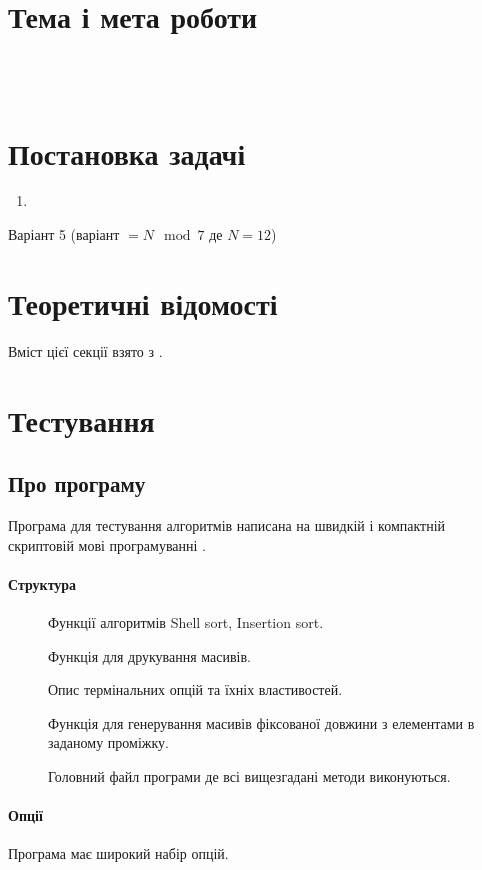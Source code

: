 \nocite{*}
\sffamily

\section{Тема і мета роботи}
 \\
 \\
\section{Постановка задачі}
\begin{enumerate}
	\item
\end{enumerate}
Варіант 5 (варіант \(=N\mod7\) де \(N=12\))

\section{Теоретичні відомості}
Вміст цієї секції взято з \cite{Karumanchi_2020}.

\section{Тестування}
\subsection{Про програму}
Програма для тестування алгоритмів написана на швидкій і компактній скриптовій мові
програмуванні .
\paragraph{Структура}
\begin{description}
	\item[] Функції алгоритмів Shell sort, Insertion sort.
	\item[] Функція для друкування масивів.
	\item[] Опис термінальних опцій та їхніх властивостей.
	\item[] Функція для генерування масивів фіксованої довжини з елементами в заданому проміжку.
	\item[] Головний файл програми де всі вищезгадані методи виконуються.
\end{description}
\paragraph{Опції}
Програма має широкий набір опцій.

